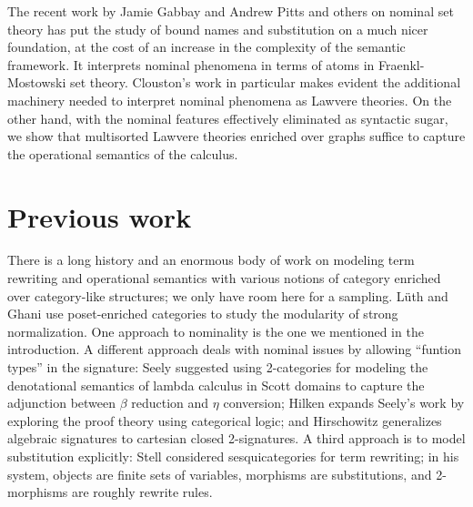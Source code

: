 \documentclass[a4paper,UKenglish]{lipics-v2016}
\begin{document}
The recent work by Jamie Gabbay and Andrew Pitts
\cite{DBLP:journals/fac/GabbayP02} and others
\cite{DBLP:journals/jcss/Clouston14} on nominal set theory has put the
study of bound names and substitution on a much nicer foundation, at
the cost of an increase in the complexity of the semantic
framework. It interprets nominal phenomena in terms of atoms in
Fraenkl-Mostowski set theory. Clouston's work in particular makes
evident the additional machinery needed to interpret nominal phenomena
as Lawvere theories. On the other hand, with the nominal features
effectively eliminated as syntactic sugar, we show that multisorted
Lawvere theories enriched over graphs suffice to capture the
operational semantics of the calculus.

\section{Previous work}

There is a long history and an enormous body of work on modeling term rewriting and operational semantics with various notions of category enriched over category-like structures; we only have room here for a sampling.  L\"uth and Ghani \cite{LuthGhani} use poset-enriched categories to study the modularity of strong normalization.  One approach to nominality is the one we mentioned in the introduction.  A different approach deals with nominal issues by allowing ``funtion types'' in the signature:  Seely \cite{DBLP:conf/lics/Seely87} 
suggested using 2-categories for modeling the denotational semantics of lambda calculus in Scott domains to capture the adjunction between $\beta$ reduction and $\eta$ conversion;  Hilken \cite{DBLP:journals/tcs/Hilken96}
expands Seely's work by exploring the proof theory using categorical logic; and Hirschowitz \cite{DBLP:journals/corr/Hirschowitz13}
generalizes algebraic signatures to cartesian closed 2-signatures.  A third approach is to model substitution explicitly: Stell \cite{Stell}
considered sesquicategories for term rewriting; in his system, objects are finite sets of variables, morphisms are substitutions, and 2-morphisms are roughly rewrite rules.
\end{document}
